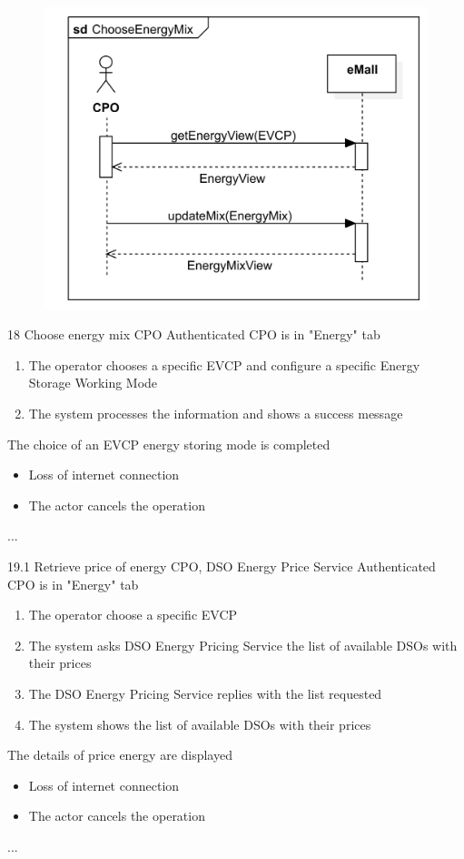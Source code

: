\pagebreak
\usecase
{
    \begin{figure}[H]
        \centering
        \includegraphics[scale=0.9]{src/sequence_diagram/chooseEnergyMix.png}
    \end{figure}
}
{18}
{Choose energy mix} %
{CPO} %
{Authenticated CPO is in "Energy" tab} %
{ %
    \begin{enumerate}
        \item The operator chooses a specific EVCP and configure a specific Energy Storage Working Mode
        \item The system processes the information and shows a success message
    \end{enumerate}
}
{The choice of an EVCP energy storing mode is completed} %
{ %
    \begin{itemize}
        \item Loss of internet connection
        \item The actor cancels the operation
    \end{itemize}
}
{ %
    ...
}




\usecase
{
}
{19.1}
{Retrieve price of energy} %
{CPO, DSO Energy Price Service} %
{Authenticated CPO is in "Energy" tab} %
{ %
    \begin{enumerate}
        \item The operator choose a specific EVCP
        \item The system asks DSO Energy Pricing Service the list of available DSOs with their prices
        \item The DSO Energy Pricing Service replies with the list requested
        \item The system shows the list of available DSOs with their prices
    \end{enumerate}
}
{The details of price energy are displayed} %
{ %
    \begin{itemize}
        \item Loss of internet connection
        \item The actor cancels the operation
    \end{itemize}
}
{ %
    ...
}

